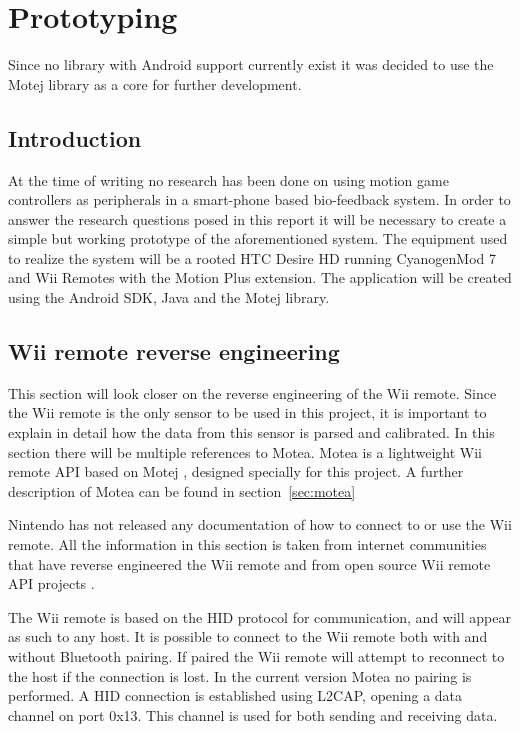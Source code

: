 \chapter{Prototyping}
Since no library with Android support currently exist it was decided to use the Motej library as a core for further development.

\section{Introduction}
At the time of writing no research has been done on using motion game controllers as peripherals in a smart-phone based bio-feedback system. In order to answer the research questions posed in this report it will be necessary to create a simple but working prototype of the aforementioned system. The equipment used to realize the system will be a rooted HTC Desire HD \cite{desireHdSpecs} running CyanogenMod 7 and Wii Remotes with the Motion Plus extension. The application will be created using the Android SDK, Java and the Motej library.

\section{Wii remote reverse engineering}
This section will look closer on the reverse engineering of the Wii remote. Since the Wii remote is the only sensor to be used in this project, it is important to explain in detail how the data from this sensor is parsed and calibrated. In this section there will be multiple references to Motea. Motea is a lightweight Wii remote API based on Motej \cite{Motej}, designed specially for this project. A further description of Motea can be found in section~\ref{sec:motea}

Nintendo has not released any documentation of how to connect to or use the Wii remote. All the information in this section is taken from internet communities \cite{wiiBrew} that have reverse engineered the Wii remote and from open source Wii remote API projects \cite{wiiMoteLib, Motej}.

The Wii remote is based on the HID protocol for communication, and will appear as such to any host. It is possible to connect to the Wii remote both with and without Bluetooth pairing. If paired the Wii remote will attempt to reconnect to the host if the connection is lost. In the current version Motea no pairing is performed. A HID connection is established using L2CAP, opening a data channel on port 0x13. This channel is used for both sending and receiving data.

